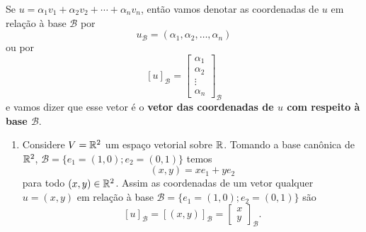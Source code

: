 \begin{notacao}
  Se $u = \alpha_1v_1 + \alpha_2v_2 + \cdots + \alpha_nv_n$,  então vamos denotar as coordenadas de $u$  em relação à base $\mathcal{B}$ por
  \[
    u_\mathcal{B} = (\alpha_1, \alpha_2, \dots, \alpha_n)
  \]
  ou por
  \[
    [u]_\mathcal{B} = \begin{bmatrix}\alpha_1\\\alpha_2\\ \vdots\\ \alpha_n\end{bmatrix}_\mathcal{B}
  \]
 e vamos dizer que esse vetor  é o \textbf{vetor das coordenadas de $u$ com respeito à base $\mathcal{B}$}.
\end{notacao}

\begin{exemplos}
  \begin{enumerate}
    \item Considere $V = \mathbb{R}^2$ um espaço vetorial sobre $\mathbb{R}$. Tomando a base canônica de $\mathbb{R}^2$, $\mathcal{B} = \{e_1 = (1, 0); e_2 = (0, 1)\}$ temos
      \[
        (x, y) = xe_1 + ye_2
      \]
      para todo $(x, y) \in \mathbb{R}^2$. Assim as coordenadas de um vetor qualquer $u = (x, y)$ em relação à base $\mathcal{B} = \{e_1 = (1, 0); e_2 = (0, 1)\}$ são
      \[
        [u]_\mathcal{B} = [(x, y)]_\mathcal{B} = \begin{bmatrix}x\\y\end{bmatrix}_\mathcal{B}.
      \]


\end{enumerate}
\end{exemplos}

